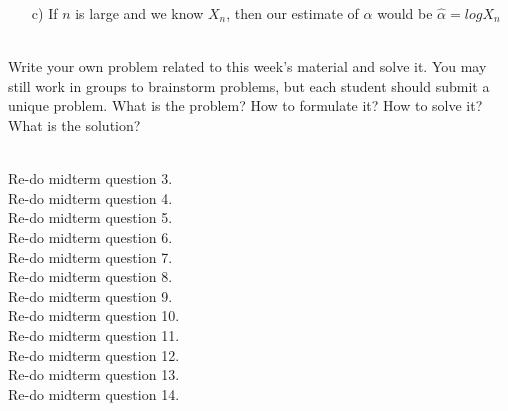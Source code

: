 \documentclass[]{article}
\begin{document}
\begin{qunlist}
{{\begin{itemize}
\[
E(X)=E(\frac{N}{n})=\frac{E(N)}{n}=(1-\frac{1}{n})^{\alpha n}
\]

\[\lim_{n \rightarrow \infty}E(X) = e^{\alpha} \]

\item[c)]
If $n$ is large and we know $X_n$, then our estimate of $\alpha$ would be $\hat{\alpha}=logX_n$


\end{itemize}
}}
\fi

 \\
Write your own problem related to this week's material and solve it. You may still work in groups to brainstorm problems, but each student should submit a unique problem. What is the problem? How to formulate it? How to solve it? What is the solution?

 \\
Re-do midterm question 3.
 \\
Re-do midterm question 4.
 \\
Re-do midterm question 5.
 \\
Re-do midterm question 6.
 \\
Re-do midterm question 7.
 \\
Re-do midterm question 8.
 \\
Re-do midterm question 9.
 \\
Re-do midterm question 10.
 \\
Re-do midterm question 11.
 \\
Re-do midterm question 12.
 \\
Re-do midterm question 13.
 \\
Re-do midterm question 14.

\end{qunlist}
\end{document}

